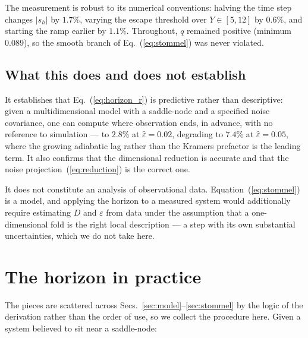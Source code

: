 \documentclass[%
 twocolumn,
 superscriptaddress,
 amsmath,amssymb,
 aps,
 pre,
 floatfix,
]{revtex4-2}
\newcommand{\Sig}{\hat\varepsilon}
\begin{document}
The measurement is robust to its numerical conventions: halving the time step changes $|s_h|$ by $1.7\%$, varying the escape threshold over $Y\in[5,12]$ by $0.6\%$, and starting the ramp earlier by $1.1\%$.  Throughout, $q$ remained positive (minimum $0.089$), so the smooth branch of Eq.~(\ref{eq:stommel}) was never violated.

\subsection{What this does and does not establish}

It establishes that Eq.~(\ref{eq:horizon_r}) is predictive rather than descriptive: given a multidimensional model with a saddle-node and a specified noise covariance, one can compute where observation ends, in advance, with no reference to simulation --- to $2.8\%$ at $\Sig=0.02$, degrading to $7.4\%$ at $\Sig=0.05$, where the growing adiabatic lag rather than the Kramers prefactor is the leading term.  It also confirms that the dimensional reduction is accurate and that the noise projection~(\ref{eq:reduction}) is the correct one.

It does not constitute an analysis of observational data.  Equation~(\ref{eq:stommel}) is a model, and applying the horizon to a measured system would additionally require estimating $D$ and $\varepsilon$ from data under the assumption that a one-dimensional fold is the right local description --- a step with its own substantial uncertainties, which we do not take here.

\section{\label{sec:recipe}The horizon in practice}

The pieces are scattered across Secs.~\ref{sec:model}--\ref{sec:stommel} by the
logic of the derivation rather than the order of use, so we collect the
procedure here.  Given a system believed to sit near a saddle-node:
\end{document}

